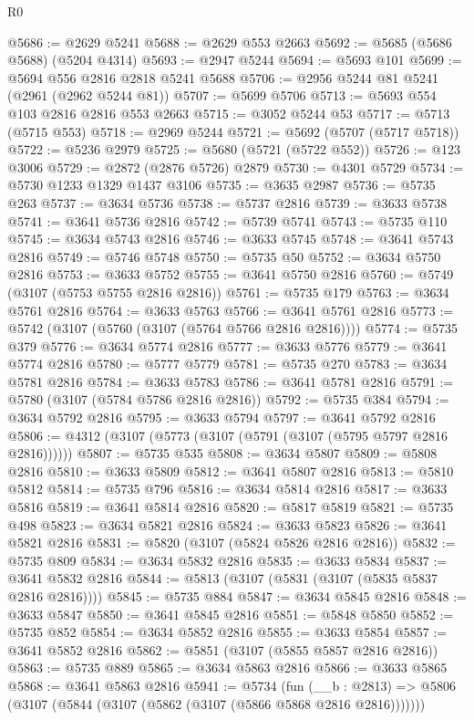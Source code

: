 \begin{lexlean}{R0}
\begin{coremodule}
@5686 := @2629 @5241
@5688 := @2629 @553 @2663
@5692 := @5685 (@5686 @5688) (@5204 @4314)
@5693 := @2947 @5244
@5694 := @5693 @101
@5699 := @5694 @556 @2816 @2818 @5241 @5688
@5706 := @2956 @5244 @81 @5241 (@2961 (@2962 @5244 @81))
@5707 := @5699 @5706
@5713 := @5693 @554 @103 @2816 @2816 @553 @2663
@5715 := @3052 @5244 @53
@5717 := @5713 (@5715 @553)
@5718 := @2969 @5244
@5721 := @5692 (@5707 (@5717 @5718))
@5722 := @5236 @2979
@5725 := @5680 (@5721 (@5722 @552))
@5726 := @123 @3006
@5729 := @2872 (@2876 @5726) @2879
@5730 := @4301 @5729
@5734 := @5730 @1233 @1329 @1437 @3106
@5735 := @3635 @2987
@5736 := @5735 @263
@5737 := @3634 @5736
@5738 := @5737 @2816
@5739 := @3633 @5738
@5741 := @3641 @5736 @2816
@5742 := @5739 @5741
@5743 := @5735 @110
@5745 := @3634 @5743 @2816
@5746 := @3633 @5745
@5748 := @3641 @5743 @2816
@5749 := @5746 @5748
@5750 := @5735 @50
@5752 := @3634 @5750 @2816
@5753 := @3633 @5752
@5755 := @3641 @5750 @2816
@5760 := @5749 (@3107 (@5753 @5755 @2816 @2816))
@5761 := @5735 @179
@5763 := @3634 @5761 @2816
@5764 := @3633 @5763
@5766 := @3641 @5761 @2816
@5773 := @5742 (@3107 (@5760 (@3107 (@5764 @5766 @2816 @2816))))
@5774 := @5735 @379
@5776 := @3634 @5774 @2816
@5777 := @3633 @5776
@5779 := @3641 @5774 @2816
@5780 := @5777 @5779
@5781 := @5735 @270
@5783 := @3634 @5781 @2816
@5784 := @3633 @5783
@5786 := @3641 @5781 @2816
@5791 := @5780 (@3107 (@5784 @5786 @2816 @2816))
@5792 := @5735 @384
@5794 := @3634 @5792 @2816
@5795 := @3633 @5794
@5797 := @3641 @5792 @2816
@5806 := @4312 (@3107 (@5773 (@3107 (@5791 (@3107 (@5795 @5797 @2816 @2816))))))
@5807 := @5735 @535
@5808 := @3634 @5807
@5809 := @5808 @2816
@5810 := @3633 @5809
@5812 := @3641 @5807 @2816
@5813 := @5810 @5812
@5814 := @5735 @796
@5816 := @3634 @5814 @2816
@5817 := @3633 @5816
@5819 := @3641 @5814 @2816
@5820 := @5817 @5819
@5821 := @5735 @498
@5823 := @3634 @5821 @2816
@5824 := @3633 @5823
@5826 := @3641 @5821 @2816
@5831 := @5820 (@3107 (@5824 @5826 @2816 @2816))
@5832 := @5735 @809
@5834 := @3634 @5832 @2816
@5835 := @3633 @5834
@5837 := @3641 @5832 @2816
@5844 := @5813 (@3107 (@5831 (@3107 (@5835 @5837 @2816 @2816))))
@5845 := @5735 @884
@5847 := @3634 @5845 @2816
@5848 := @3633 @5847
@5850 := @3641 @5845 @2816
@5851 := @5848 @5850
@5852 := @5735 @852
@5854 := @3634 @5852 @2816
@5855 := @3633 @5854
@5857 := @3641 @5852 @2816
@5862 := @5851 (@3107 (@5855 @5857 @2816 @2816))
@5863 := @5735 @889
@5865 := @3634 @5863 @2816
@5866 := @3633 @5865
@5868 := @3641 @5863 @2816
@5941 := @5734
    (fun (__b : @2813) => @5806 (@3107 (@5844 (@3107 (@5862 (@3107 (@5866 @5868 @2816 @2816)))))))

\end{coremodule}
\end{lexlean}
